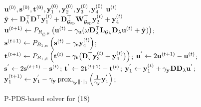 \begin{figure}[!t]
	\begin{algorithm}[H]
	    \caption{P-PDS-based solver for (18)}
		\label{algo_DPPDS}
		\begin{algorithmic}[1]
			\REQUIRE $\mathbf{u}^{(0)}, \mathbf{s}^{(0)}, \mathbf{t}^{(0)}, \mathbf{y}_{1}^{(0)}, \mathbf{y}_{2}^{(0)}, \mathbf{y}_{3}^{(0)}, \mathbf{y}_{4}^{(0)}$
			\ENSURE $\mathbf{u}^{(t)}$
				\STATE $\tilde{\mathbf{y}_{}} \leftarrow \mathbf{D}_{\lambda}^{\top} \mathbf{D}^{\top} \mathbf{y}_{1}^{(t)} + \mathbf{D}_{\mathcal{G}_{\text{sp}}}^{\top} \mathbf{W}_{\mathcal{G}_{\text{sp}}}^{\top} \mathbf{y}_{2}^{(t)} + \mathbf{y}_{4}^{(t)}$
    			\STATE $\mathbf{u}^{(t+1)} \leftarrow P_{R_{\underline{\mu},\bar{\mu}}}\left(\mathbf{u}^{(t)} - \gamma_{\mathbf{u}} (\omega \mathbf{D}_{\lambda}^{\top} \mathbf{L}_{\mathcal{G}_{\lambda}} \mathbf{D}_{\lambda} \mathbf{u}^{(t)} + \tilde{\mathbf{y}_{}}) \right)$;
    			\STATE $\mathbf{s}^{(t+1)} \leftarrow P_{B_{1, \alpha}} \left( \mathbf{s}^{(t)} - \gamma_{\mathbf{s}} \mathbf{y}_{4}^{(t)} \right)$;
				\STATE $\mathbf{t}^{(t+1)} \leftarrow P_{B_{1, \beta}} \left( \mathbf{t}^{(t)} - \gamma_{\mathbf{t}} \bigl( \mathbf{D}_{\text{v}}^{\top} \mathbf{y}_{3}^{(t)} + \mathbf{y}_{4}^{(t)} \bigr) \right)$;
				\STATE $\mathbf{u}^{'} \leftarrow 2\mathbf{u}^{(t+1)} - \mathbf{u}^{(t)}$;
				\STATE $\mathbf{s}^{'} \leftarrow 2\mathbf{s}^{(t+1)} - \mathbf{s}^{(t)}$;
				\STATE $\mathbf{t}^{'} \leftarrow 2\mathbf{t}^{(t+1)} - \mathbf{t}^{(t)}$;
				\STATE $\mathbf{y}_{1}^{'} \leftarrow \mathbf{y}_{1}^{(t)} + \gamma_{\mathbf{y}_{}} \mathbf{D} \mathbf{D}_{\lambda} \mathbf{u}^{'}$;
    			\STATE $\mathbf{y}_{1}^{(t+1)} \leftarrow \mathbf{y}_{1}^{'} - \gamma_{\mathbf{y}_{}} \operatorname{prox}_{\gamma_{\mathbf{y}_{}} \| \cdot \|_{1}} \left(\frac{1}{\gamma_{\mathbf{y}_{}}} \mathbf{y}_{1}^{'}  \right)$;

\end{algorithmic}
\end{algorithm}
\end{figure}
